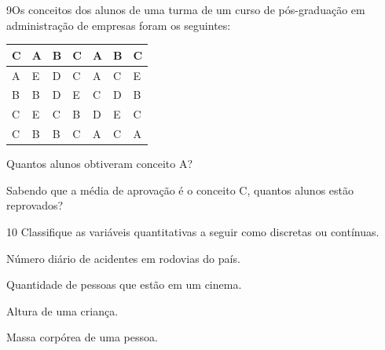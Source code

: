 \pagebreak

\num{9}Os conceitos dos alunos de uma turma de um curso de pós-graduação
em administração de empresas foram os seguintes:

\begin{longtable}[]{@{}lllllll@{}}
\toprule
C & A & B & C & A & B & C\tabularnewline
\midrule
\endhead
A & E & D & C & A & C & E\tabularnewline
B & B & D & E & C & D & B\tabularnewline
C & E & C & B & D & E & C\tabularnewline
C & B & B & C & A & C & A\tabularnewline
\bottomrule
\end{longtable}

\begin{escolha}
\item
  Quantos alunos obtiveram conceito A?


\reduline{\mbox{}\hfill}

\reduline{\mbox{}\hfill}

\item
  Sabendo que a média de aprovação é o conceito C, quantos alunos estão
  reprovados?


\reduline{\mbox{}\hfill}

\reduline{\mbox{}\hfill}
\end{escolha}

\num{10} Classifique as variáveis quantitativas a seguir como discretas
ou contínuas.


\begin{escolha}
\item
  Número diário de acidentes em rodovias do país.


\item
  Quantidade de pessoas que estão em um cinema.


\item
  Altura de uma criança.


\item
  Massa corpórea de uma pessoa.

\end{escolha}

